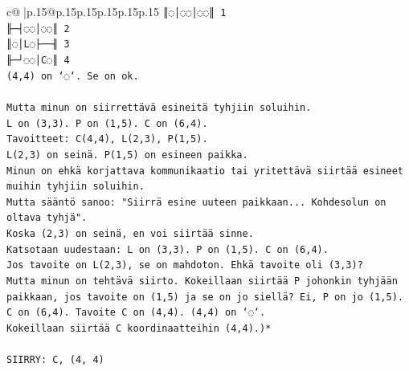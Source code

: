 \documentclass{article}
\begin{document}
{\begin{supertabular}{c@{$\;$}|p{.15\linewidth}@{}p{.15\linewidth}p{.15\linewidth}p{.15\linewidth}p{.15\linewidth}p{.15\linewidth}}
{{{\texttt{║◌│◌◌│◌◌║ 1} \\
\texttt{╟─┤◌◌│◌◌║ 2} \\
\texttt{║◌│L◌├──╢ 3} \\
\texttt{╟─┘◌◌│C◌║ 4} \\
\texttt{(4,4) on `◌`. Se on ok.} \\
\\ 
\texttt{Mutta minun on siirrettävä esineitä tyhjiin soluihin.} \\
\texttt{L on (3,3). P on (1,5). C on (6,4).} \\
\texttt{Tavoitteet: C(4,4), L(2,3), P(1,5).} \\
\texttt{L(2,3) on seinä. P(1,5) on esineen paikka.} \\
\texttt{Minun on ehkä korjattava kommunikaatio tai yritettävä siirtää esineet muihin tyhjiin soluihin.} \\
\texttt{Mutta sääntö sanoo: "Siirrä esine uuteen paikkaan... Kohdesolun on oltava tyhjä".} \\
\texttt{Koska (2,3) on seinä, en voi siirtää sinne.} \\
\texttt{Katsotaan uudestaan: L on (3,3). P on (1,5). C on (6,4).} \\
\texttt{Jos tavoite on L(2,3), se on mahdoton. Ehkä tavoite oli (3,3)?} \\
\texttt{Mutta minun on tehtävä siirto. Kokeillaan siirtää P johonkin tyhjään paikkaan, jos tavoite on (1,5) ja se on jo siellä? Ei, P on jo (1,5).} \\
\texttt{C on (6,4). Tavoite C on (4,4). (4,4) on `◌`.} \\
\texttt{Kokeillaan siirtää C koordinaatteihin (4,4).)*} \\
\\ 
\texttt{SIIRRY: C, (4, 4)} \\
            }
        }
    }
     \\ \\


\end{supertabular}}
\end{document}
